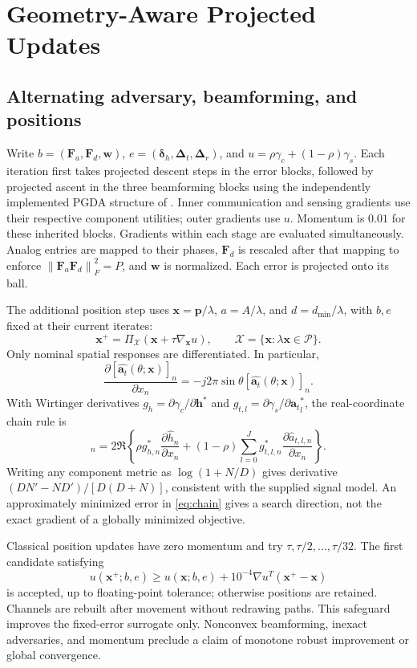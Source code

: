 \documentclass[10pt,journal,onecolumn,draftclsnofoot]{IEEEtran}
\newcommand{\Fa}{\mathbf F_a}
\newcommand{\Fd}{\mathbf F_d}
\newcommand{\pp}{\mathbf p}
\newcommand{\xx}{\mathbf x}
\newcommand{\ww}{\mathbf w}
\newcommand{\at}{{\mathbf a_t}}
\newcommand{\hh}{\mathbf h}
\newcommand{\ddelta}{\bm\delta}
\newcommand{\norm}[1]{\left\|#1\right\|}
\begin{document}
\section{Geometry-Aware Projected Updates}
\subsection{Alternating adversary, beamforming, and positions}
Write $b=(\Fa,\Fd,\ww)$, $e=(\ddelta_h,\bm\Delta_t,\bm\Delta_r)$, and $u=\rho\gamma_c+(1-\rho)\gamma_s$. Each iteration first takes projected descent steps in the error blocks, followed by projected ascent in the three beamforming blocks using the independently implemented PGDA structure of \cite{wang2026}. Inner communication and sensing gradients use their respective component utilities; outer gradients use $u$. Momentum is $0.01$ for these inherited blocks. Gradients within each stage are evaluated simultaneously. Analog entries are mapped to their phases, $\Fd$ is rescaled after that mapping to enforce $\norm{\Fa\Fd}_F^2=P$, and $\ww$ is normalized. Each error is projected onto its ball.

The additional position step uses $\xx=\pp/\lambda$, $a=A/\lambda$, and $d=d_{\min}/\lambda$, with $b,e$ fixed at their current iterates:
\begin{equation}
 \xx^+=\Pi_{\mathcal X}(\xx+\tau\nabla_{\xx}u),\qquad
 \mathcal X=\{\xx:\lambda\xx\in\mathcal P\}.\label{eq:update}
\end{equation}
Only nominal spatial responses are differentiated. In particular,
\begin{equation}
 \frac{\partial[\widehat\at(\theta;\xx)]_n}{\partial x_n}
 =-j2\pi\sin\theta[\widehat\at(\theta;\xx)]_n.\label{eq:der}
\end{equation}
With Wirtinger derivatives $g_h=\partial\gamma_c/\partial\hh^*$ and $g_{t,l}=\partial\gamma_s/\partial\at_l^*$, the real-coordinate chain rule is
\begin{equation}
 [\nabla_{\xx}u]_n=2\Re\left\{\rho g_{h,n}^*\frac{\partial\widehat h_n}{\partial x_n}
 +(1-\rho)\sum_{l=0}^Jg_{t,l,n}^*\frac{\partial\widehat a_{t,l,n}}{\partial x_n}\right\}.\label{eq:chain}
\end{equation}
Writing any component metric as $\log(1+N/D)$ gives derivative $(DN'-ND')/[D(D+N)]$, consistent with the supplied signal model. An approximately minimized error in \eqref{eq:chain} gives a search direction, not the exact gradient of a globally minimized objective.

Classical position updates have zero momentum and try $\tau,\tau/2,\ldots,\tau/32$. The first candidate satisfying
\begin{equation}
 u(\xx^+;b,e)\ge u(\xx;b,e)+10^{-4}\nabla u^T(\xx^+-\xx)\label{eq:armijo}
\end{equation}
is accepted, up to floating-point tolerance; otherwise positions are retained. Channels are rebuilt after movement without redrawing paths. This safeguard improves the fixed-error surrogate only. Nonconvex beamforming, inexact adversaries, and momentum preclude a claim of monotone robust improvement or global convergence.
\end{document}
